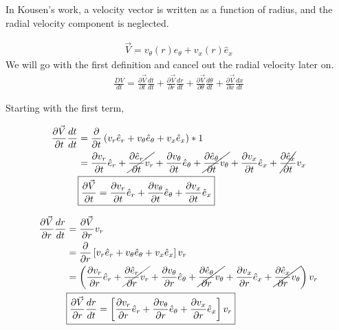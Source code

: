 In Kousen's work, a velocity vector is written as a function of radius, and the radial velocity component is neglected.

\begin{align}
\vec{V} = v_{\theta}(r) \hat{e}_{\theta} +
v_x(r) \hat{e}_x
\end{align}
We will go with the first definition and cancel out the radial velocity later on.
\begin{align*}
\frac{DV}{dt} =
\frac{\partial \vec{V}}{ \partial t}\frac{dt}{dt} +
\frac{\partial \vec{V}}{ \partial r}\frac{dr}{dt} +
\frac{\partial \vec{V}}{ \partial \theta}\frac{d\theta}{dt} +
\frac{\partial \vec{V}}{ \partial x}\frac{dx}{dt} 
\end{align*}


Starting with the first term,

\begin{align*}
\frac{\partial \vec{V}}{ \partial t}\frac{dt}{dt}	
&= \frac{\partial}{\partial t}
\left(
v_r 	   \hat{e}_r +
v_{\theta} \hat{e}_{\theta} +
v_x		   \hat{e}_x
\right) * 1 \\ 
&=
\frac{\partial 		  v_r}{\partial t} 		\hat{e}_r +
\cancel{\frac{\partial  \hat{e}_r}{\partial t} 		v_r}       +
\frac{\partial v_{\theta}}{\partial t}		\hat{e}_{\theta} +
\cancel{\frac{\partial \hat{e}_{\theta}}{\partial t} v_{\theta}}  +
\frac{\partial v_x}{\partial t}\hat{e}_{x} +
\cancel{\frac{\partial \hat{e}_{x}}{\partial t}}v_x \\  
&\boxed{
	\frac{\partial \vec{V}}{ \partial t} = 
	\frac{\partial 		  v_r}{\partial t} 		\hat{e}_r +
	\frac{\partial v_{\theta}}{\partial t}		\hat{e}_{\theta} + 
	\frac{\partial v_x}{\partial t}\hat{e}_{x}}
\end{align*}

\begin{align*}
\frac{\partial \vec{V}}{ \partial r}\frac{dr}{dt} 
&= \frac{\partial \vec{V}}{ \partial r}v_r\\ 
&= \frac{\partial}{\partial r}
\left[
v_r 	   \hat{e}_r +
v_{\theta} \hat{e}_{\theta} +
v_x		   \hat{e}_x
\right]  v_r \\ 
&=
\left(
\frac{\partial v_r}{\partial r} 		\hat{e}_r +
\cancel{\frac{\partial  \hat{e}_r}{\partial r} 		v_r}       +
\frac{\partial v_{\theta}}{\partial r}		\hat{e}_{\theta} +
\cancel{\frac{\partial \hat{e}_{\theta}}{\partial r} v_{\theta}}  +
\frac{\partial v_x}{\partial r}\hat{e}_{x} +
\cancel{\frac{\partial \hat{e}_{x}}{\partial r} v_{\theta}} \right) v_r\\ 
&\boxed{ 
	\frac{\partial \vec{V}}{ \partial r}\frac{dr}{dt}     = \left[
	\frac{\partial 		  v_r}{\partial r} 		\hat{e}_r +
	\frac{\partial v_{\theta}}{\partial r}		\hat{e}_{\theta} +
	\frac{\partial v_x}{\partial r}\hat{e}_{x}\right] v_r} \\
\end{align*}

